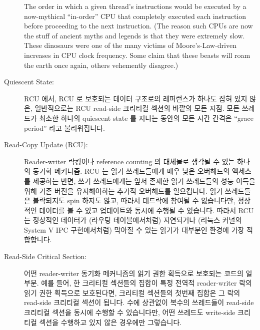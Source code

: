\begin{description}
	The order in which a given thread's instructions
	would be executed by a now-mythical ``in-order'' CPU that
	completely executed each instruction before proceeding to
	the next instruction.
	(The reason such CPUs are now the stuff of ancient myths
	and legends is that they were extremely slow.
	These dinosaurs were one of the many victims of
	Moore's-Law-driven increases in CPU clock frequency.
	Some claim that these beasts will roam the earth once again,
	others vehemently disagree.)
	\fi
\item[Quiescent State:]
	RCU 에서, RCU 로 보호되는 데이터 구조로의 레퍼런스가 하나도 잡혀 있지
	않은, 일반적으로는 RCU read-side 크리티컬 섹션의 바깥의 모든 지점.
	모든 쓰레드가 최소한 하나의 quiescent state 를 지나는 동안의 모든 시간
	간격은 ``grace period'' 라고 불리워집니다.
	\iffalse

	In RCU, a point in the code where there can be no references held
	to RCU-protected data structures, which is normally any point
	outside of an RCU read-side critical section.
	Any interval of time during which all threads pass through at
	least one quiescent state each is termed a ``grace period''.
	\fi
\item[Read-Copy Update (RCU):]
	Reader-writer 락킹이나 reference counting 의 대체물로 생각될 수 있는
	하나의 동기화 메커니즘.
	RCU 는 읽기 쓰레드들에게 매우 낮은 오버헤드의 액세스를 제공하는 반면,
	쓰기 쓰레드에게는 앞서 존재한 읽기 쓰레드들의 성능 이득을 위해 기존
	버전을 유지해야하는 추가적 오버헤드를 일으킵니다.
	읽기 쓰레드들은 블락되지도 spin 하지도 않고, 따라서 데드락에 참여될 수
	없습니다만, 정상적인 데이터를 볼 수 있고 업데이트와 동시에 수행될 수
	있습니다.
	따라서 RCU 는 정상적인 데이터가 (라우팅 테이블에서처럼) 지연되거나
	(리눅스 커널의 System V IPC 구현에서처럼) 막아질 수 있는 읽기가
	대부분인 환경에 가장 적합합니다.
	\iffalse

	A synchronization mechanism that can be thought of as a replacement
	for reader-writer locking or reference counting.
	RCU provides extremely low-overhead access for readers, while
	writers incur additional overhead maintaining old versions
	for the benefit of pre-existing readers.
	Readers neither block nor spin, and thus cannot participate in
	deadlocks, however, they also can see stale data and can
	run concurrently with updates.
	RCU is thus best-suited for read-mostly situations where
	stale data can either be tolerated (as in routing tables)
	or avoided (as in the Linux kernel's System V IPC implementation).
	\fi
\item[Read-Side Critical Section:]
	어떤 reader-writer 동기화 메커니즘의 읽기 권한 획득으로 보호되는 코드의
	일부분.
	예를 들어, 한 크리티컬 섹션들의 집합이 특정 전역적 reader-writer 락의
	읽기 권한 획득으로 보호된다면, 크리티컬 섹션들의 첫번째 집합은 그 락의
	read-side 크리티컬 섹션이 됩니다.
	수에 상관없이 복수의 쓰레드들이 read-side 크리티컬 섹션을 동시에 수행할
	수 있습니다만, 어떤 쓰레드도 write-side 크리티컬 섹션을 수행하고 있지
	않은 경우에만 그렇습니다.
	\iffalse


\end{description}
